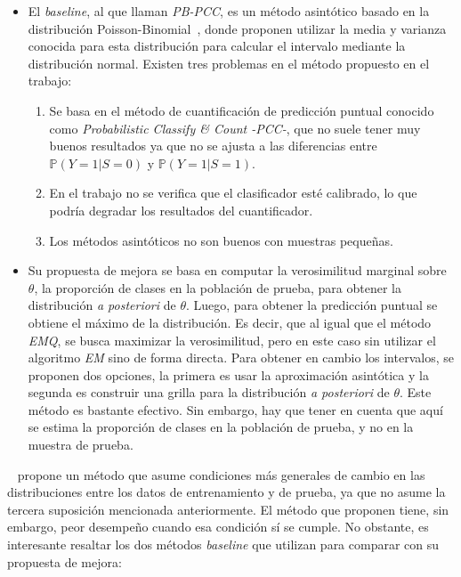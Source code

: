 \begin{itemize}
    \item El {\it baseline}, al que llaman {\it PB-PCC}, es un método asintótico
    basado en la distribución Poisson-Binomial~\cite{le1960approximation,
    wang1993number}, donde proponen utilizar la media y varianza conocida para
    esta distribución para calcular el intervalo mediante la distribución
    normal. Existen tres problemas en el método propuesto en el trabajo:
        \begin{enumerate}
            \item Se basa en el método de cuantificación de predicción puntual
            conocido como {\it Probabilistic Classify \& Count -PCC-}, que no
            suele tener muy buenos resultados ya que no se ajusta a las
            diferencias entre $\mathbb{P}(Y=1|S=0)$ y
            $\mathbb{P}(Y=1|S=1)$.\label{keith_item_uno}
            \item En el trabajo no se verifica que el clasificador esté
            calibrado, lo que podría degradar los resultados del
            cuantificador.\label{keith_item_dos}
            \item Los métodos asintóticos no son buenos con muestras pequeñas.
        \end{enumerate}
    \item Su propuesta de mejora se basa en computar la verosimilitud marginal
    sobre $\theta$, la proporción de clases en la población de prueba, para
    obtener la distribución {\it a posteriori\/} de $\theta$. Luego, para
    obtener la predicción puntual se obtiene el máximo de la distribución. Es
    decir, que al igual que el método {\it EMQ}, se busca maximizar la
    verosimilitud, pero en este caso sin utilizar el algoritmo {\it EM\/} sino
    de forma directa. Para obtener en cambio los intervalos, se proponen dos
    opciones, la primera es usar la aproximación asintótica y la segunda es
    construir una grilla para la distribución {\it a posteriori\/} de $\theta$.
    Este método es bastante efectivo. Sin embargo, hay que tener en cuenta que
    aquí se estima la proporción de clases en la población de prueba, y no en la
    muestra de prueba.
\end{itemize}

~\citet{denham2021gain} propone un método que asume condiciones más generales de
cambio en las distribuciones entre los datos de entrenamiento y de prueba, ya
que no asume la tercera suposición mencionada anteriormente. El método que
proponen tiene, sin embargo, peor desempeño cuando esa condición sí se cumple.
No obstante, es interesante resaltar los dos métodos {\it baseline\/} que
utilizan para comparar con su propuesta de mejora:

